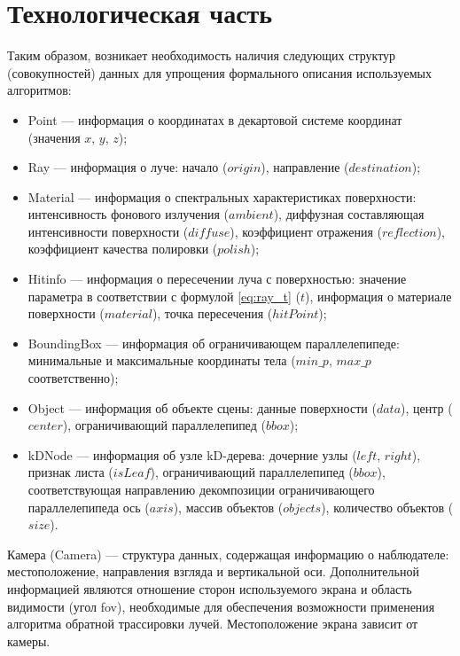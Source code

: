 \chapter{Технологическая часть}




Таким образом, возникает необходимость наличия следующих структур (совокупностей) данных для упрощения формального описания используемых алгоритмов:

\begin{itemize}
	\item Point --- информация о координатах в декартовой системе координат (значения $x$, $y$, $z$);
	\item Ray --- информация о луче: начало ($origin$), направление ($destination$);
	\item Material --- информация о спектральных характеристиках поверхности: интенсивность фонового излучения ($ambient$), диффузная составляющая интенсивности поверхности ($diffuse$), коэффициент отражения ($reflection$), коэффициент качества полировки ($polish$);
	\item Hitinfo --- информация о пересечении луча с поверхностью: значение параметра в соответствии с формулой \ref{eq:ray_t} ($t$), информация о материале поверхности ($material$), точка пересечения ($hitPoint$);
	\item BoundingBox --- информация об ограничивающем параллелепипеде: минимальные и максимальные координаты тела ($min\_p$, $max\_p$ соответственно);
	\item Object --- информация об объекте сцены: данные поверхности ($data$), центр ($center$), ограничивающий параллелепипед ($bbox$);
	\item kDNode --- информация об узле kD-дерева: дочерние узлы ($left$, $right$), признак листа ($isLeaf$), ограничивающий параллелепипед ($bbox$), соответствующая направлению декомпозиции ограничивающего параллелепипеда ось ($axis$), массив объектов ($objects$), количество объектов ($size$).
\end{itemize}

Камера (Camera) --- структура данных, содержащая информацию о наблюдателе: местоположение, направления взгляда и вертикальной оси.
Дополнительной информацией являются отношение сторон используемого экрана и область видимости (угол fov), необходимые для обеспечения возможности применения алгоритма обратной трассировки лучей.
Местоположение экрана зависит от камеры.